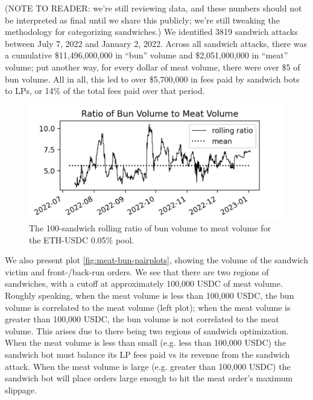         (NOTE TO READER: we're still reviewing data, and these numbers should not be interpreted as final until we share this publicly; we're still tweaking the methodology for categorizing sandwiches.) We identified 3819 sandwich attacks between July 7, 2022 and January 2, 2022. Across all sandwich attacks, there was a cumulative \$11,496,000,000 in ``bun'' volume and \$2,051,000,000 in ``meat'' volume; put another way, for every dollar of meat volume, there were over \$5 of bun volume. All in all, this led to over \$5,700,000 in fees paid by sandwich bots to LPs, or 14\% of the total fees paid over that period.

        \begin{figure}
            \label{fig:meat-bun-ratio}
            \centering
            \includegraphics[scale=.4]{figs/bun-to-meat-ratio.png}
            \caption{The 100-sandwich rolling ratio of bun volume to meat volume for the ETH-USDC 0.05\% pool.}
        \end{figure}

        We also present plot \ref{fig:meat-bun-pairplots}, showing the volume of the sandwich victim and front-/back-run orders. We see that there are two regions of sandwiches, with a cutoff at approximately 100,000 USDC of meat volume. Roughly speaking, when the meat volume is less than 100,000 USDC, the bun volume is correlated to the meat volume (left plot); when the meat volume is greater than 100,000 USDC, the bun volume is not correlated to the meat volume. This arises due to there being two regions of sandwich optimization. When the meat volume is less than small (e.g. less than 100,000 USDC) the sandwich bot must balance its LP fees paid vs its revenue from the sandwich attack. When the meat volume is large (e.g. greater than 100,000 USDC) the sandwich bot will place orders large enough to hit the meat order's maximum slippage.

